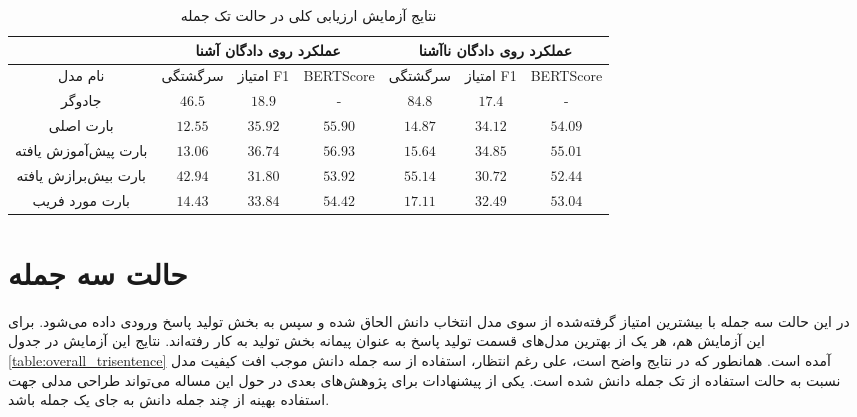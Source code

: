 \begin{table}[ht]
	\caption{نتایج آزمایش ارزیابی کلی در حالت تک جمله}
	\label{table:overall_unisentence}
	\begin{tabular}{|c|c|c|c|c|c|c|}
		\hline
		& \multicolumn{3}{c|}{عملکرد روی دادگان آشنا} & \multicolumn{3}{c|}{عملکرد روی دادگان نا‌آشنا} \\ \hline
		نام مدل              & سرگشتگی     & امتیاز F1     & BERTScore     & سرگشتگی      & امتیاز F1      & BERTScore      \\ \hline
		جادوگر               & $46.5$      & $18.9$        & -             & $84.8$       & $17.4$         & -              \\ \hline
		بارت اصلی            & $12.55$     & $35.92$       & $55.90$       & $14.87$      & $34.12$        & $54.09$        \\ \hline
		بارت پیش‌آموزش یافته & $13.06$     & $36.74$       & $56.93$       & $15.64$      & $34.85$        & $55.01$        \\ \hline
		بارت بیش‌برازش یافته & $42.94$     & $31.80$       & $53.92$       & $55.14$      & $30.72$        & $52.44$        \\ \hline
		بارت مورد فریب       & $14.43$     & $33.84$       & $54.42$       & $17.11$      & $32.49$        & $53.04$        \\ \hline
	\end{tabular}
\end{table}


\section{حالت سه جمله}
 در این حالت سه جمله با بیشترین امتیاز گرفته‌شده از سوی مدل انتخاب دانش
 الحاق شده و سپس  به بخش تولید پاسخ ورودی داده می‌شود. برای این آزمایش هم، هر یک از بهترین مدل‌های قسمت تولید پاسخ به عنوان پیمانه بخش تولید به کار رفته‌اند. نتایج این آزمایش در جدول 
 \ref{table:overall_trisentence} 
 آمده است. همانطور که در نتایج واضح است، علی رغم انتظار، استفاده از سه جمله دانش موجب افت کیفیت مدل نسبت به حالت استفاده از تک جمله دانش شده است. یکی از پیشنهادات برای پژوهش‌های بعدی در حول این مساله می‌تواند طراحی مدلی جهت استفاده بهینه از چند جمله دانش به جای یک جمله باشد. 
 
